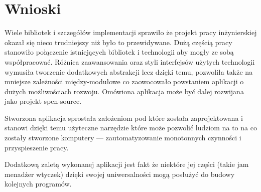 \chapter{Wnioski}
\label{wnioski}

\par
Wiele bibliotek i szczegółów implementacji sprawiło że projekt pracy inżynierskiej okazał się nieco trudniejszy niż było to przewidywane.
Dużą częścią pracy stanowiło połączenie istniejących bibliotek i technologii aby mogły ze sobą współpracować. Różnica zaawansowania oraz styli interfejsów użytych technologii wymusiła tworzenie dodatkowych abstrakcji lecz dzięki temu, pozwoliła także na mniejsze zależności między-modułowe co zaowocowało powstaniem aplikacji o dużych możliwościach rozwoju. Omówiona aplikacja może być dalej rozwijana jako projekt spen-source.

\par
Stworzona aplikacja sprostała założeniom pod które została zaprojektowana i stanowi dzięki temu użyteczne narzędzie które może pozwolić ludziom na to na co zostały stworzone komputery --- zautomatyzowanie monotonnych czynności i przyspieszenie pracy.

\par
Dodatkową zaletą wykonanej aplikacji jest fakt że niektóre jej części (takie jam menadżer wtyczek) dzięki swojej uniwersalności mogą posłużyć do budowy kolejnych programów.
